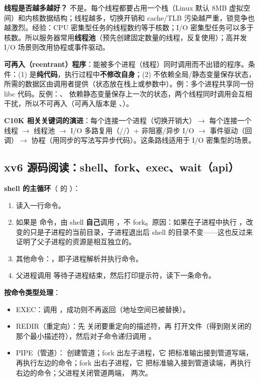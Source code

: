 \textbf{线程是否越多越好？} 不是。每个线程都要占用一个栈（Linux 默认 8MB 虚拟空间）和内核数据结构；线程越多，切换开销和 cache/TLB 污染越严重，锁竞争也越激烈。经验：CPU 密集型任务的线程数约等于核数；I/O 密集型任务可以多于核数。所以服务器常用\textbf{线程池}（预先创建固定数量的线程，反复使用）；高并发 I/O 场景则改用协程或事件驱动。

\textbf{可再入（reentrant）程序}：能被多个进程（线程）同时调用而不出错的程序。条件：(1) 是\textbf{纯代码}，执行过程中\textbf{不修改自身}；(2) 不依赖全局/静态变量保存状态，所需的数据区由调用者提供（状态放在栈上或参数中）。例：多个进程共享同一份 libc 代码。反例：、 依赖静态变量保存上一次的状态，两个线程同时调用会互相干扰，所以不可再入（可再入版本是 、）。

\textbf{C10K 相关关键词的演进}：每个连接一个进程（切换开销大）$\to$ 每个连接一个线程 $\to$ 线程池 $\to$ I/O 多路复用（//）+ 非阻塞/异步 I/O $\to$ 事件驱动（回调）$\to$ 协程（用同步的写法写异步代码）。这条路线适用于 I/O 密集型的场景。

\subsection{xv6 源码阅读：shell、fork、exec、wait（api）}

\textbf{shell 的主循环}（ 的 ）：
\begin{enumerate}
    \item {} 读入一行命令。
    \item 如果是  命令，由 shell \textbf{自己}调用 ，不 fork。原因：如果在子进程中执行 ，改变的只是子进程的当前目录，子进程退出后 shell 的目录不变——这也反过来证明了父子进程的资源是相互独立的。
    \item 其他命令：，即子进程解析并执行命令。
    \item 父进程调用  等待子进程结束，然后打印提示符，读下一条命令。
\end{enumerate}
\textbf{ 按命令类型处理}：
\begin{itemize}
    \item EXEC：调用 ，成功则不再返回（地址空间已被替换）。
    \item REDIR（重定向）：先  关闭要重定向的描述符，再  打开文件（得到刚关闭的那个最小描述符），然后对子命令递归调用 。
    \item PIPE（管道）： 创建管道；fork 出左子进程，它  把标准输出接到管道写端，再执行左边的命令；fork 出右子进程，它  把标准输入接到管道读端，再执行右边的命令；父进程关闭管道两端， 两次。
\end{itemize}

